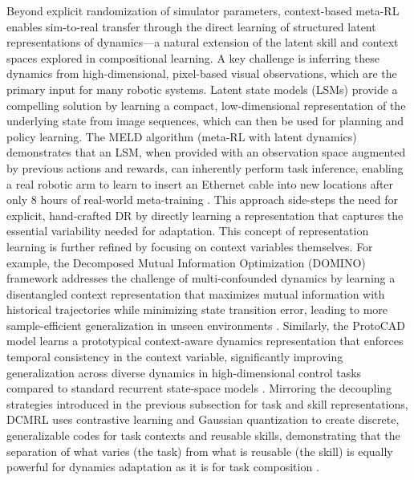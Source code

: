 \documentclass[11pt]{article}
\begin{document}
Beyond explicit randomization of simulator parameters, context-based meta-RL enables sim-to-real transfer through the direct learning of structured latent representations of dynamics---a natural extension of the latent skill and context spaces explored in compositional learning. A key challenge is inferring these dynamics from high-dimensional, pixel-based visual observations, which are the primary input for many robotic systems. Latent state models (LSMs) provide a compelling solution by learning a compact, low-dimensional representation of the underlying state from image sequences, which can then be used for planning and policy learning. The MELD algorithm (meta-RL with latent dynamics) demonstrates that an LSM, when provided with an observation space augmented by previous actions and rewards, can inherently perform task inference, enabling a real robotic arm to learn to insert an Ethernet cable into new locations after only 8 hours of real-world meta-training \cite{ref403}. This approach side-steps the need for explicit, hand-crafted DR by directly learning a representation that captures the essential variability needed for adaptation. This concept of representation learning is further refined by focusing on context variables themselves. For example, the Decomposed Mutual Information Optimization (DOMINO) framework addresses the challenge of multi-confounded dynamics by learning a disentangled context representation that maximizes mutual information with historical trajectories while minimizing state transition error, leading to more sample-efficient generalization in unseen environments \cite{ref312}. Similarly, the ProtoCAD model learns a prototypical context-aware dynamics representation that enforces temporal consistency in the context variable, significantly improving generalization across diverse dynamics in high-dimensional control tasks compared to standard recurrent state-space models \cite{ref404}. Mirroring the decoupling strategies introduced in the previous subsection for task and skill representations, DCMRL uses contrastive learning and Gaussian quantization to create discrete, generalizable codes for task contexts and reusable skills, demonstrating that the separation of what varies (the task) from what is reusable (the skill) is equally powerful for dynamics adaptation as it is for task composition \cite{ref321}.
\end{document}
